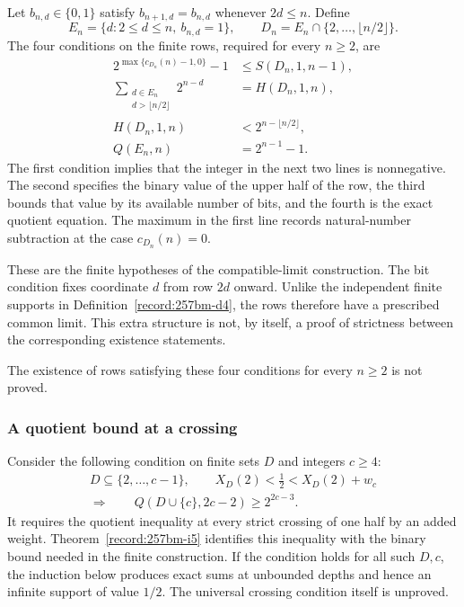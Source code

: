 \begin{thm}\label{record:257bm-c3}
Let $b_{n,d}\in\{0,1\}$ satisfy $b_{n+1,d}=b_{n,d}$ whenever
$2d\le n$.  Define
\[
 E_n=\{d:2\le d\le n,\ b_{n,d}=1\},\qquad
 D_n=E_n\cap\{2,\ldots,\lfloor n/2\rfloor\}.
\]
The four conditions on the finite rows, required for every $n\ge2$, are
\[
 \begin{aligned}
 2^{\max\{c_{D_n}(n)-1,0\}}-1&\le S(D_n,1,n-1),\\
 \sum_{\substack{d\in E_n\\d>\lfloor n/2\rfloor}}2^{n-d}
     &=H(D_n,1,n),\\
 H(D_n,1,n)&<2^{n-\lfloor n/2\rfloor},\\
 Q(E_n,n)&=2^{n-1}-1.
 \end{aligned}
\]
The first condition implies that the integer in the next two lines is
nonnegative.  The second specifies the binary value of the upper half of
the row, the third bounds that value by its available number of bits, and
the fourth is the exact quotient equation.  The maximum in the first line
records natural-number subtraction at the case $c_{D_n}(n)=0$.

These are the finite hypotheses of the compatible-limit construction.
The bit condition fixes coordinate $d$ from row $2d$ onward.  Unlike the
independent finite supports in Definition~\ref{record:257bm-d4}, the rows
therefore have a prescribed common limit.  This extra structure is not,
by itself, a proof of strictness between the corresponding existence
statements.
\end{thm}
The existence of rows satisfying these four conditions for every $n\ge2$
is not proved.

\subsubsection*{A quotient bound at a crossing}

\begin{thm}\label{record:257bm-c4}
Consider the following condition on finite sets $D$ and integers $c\ge4$:
\[
 \begin{gathered}
 D\subseteq\{2,\ldots,c-1\},\qquad
 X_D(2)<\frac12<X_D(2)+w_c\\[2pt]
 \Longrightarrow\qquad Q(D\cup\{c\},2c-2)\ge2^{2c-3}.
 \end{gathered}
\]
It requires the quotient inequality at every strict crossing of one half
by an added weight.  Theorem~\ref{record:257bm-i5} identifies this
inequality with the binary bound needed in the finite construction.
If the condition holds for all such $D,c$, the induction below produces
exact sums at unbounded depths and hence an infinite support of value
$1/2$.  The universal crossing condition itself is unproved.
\end{thm}

